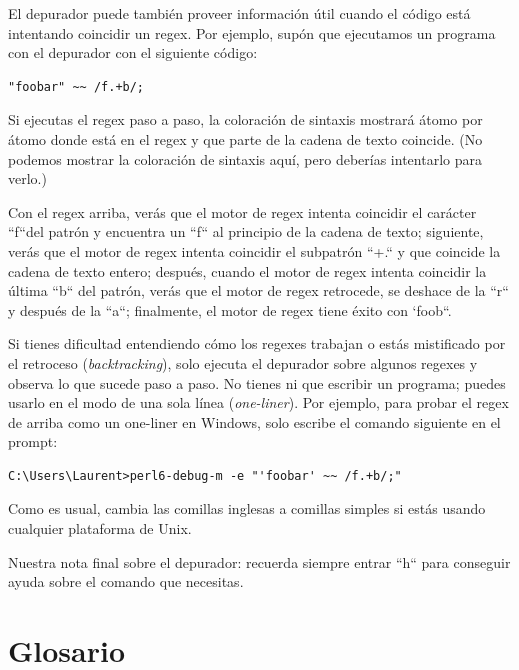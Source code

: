 El depurador puede también proveer información útil cuando
el código está intentando coincidir un regex. Por ejemplo, 
supón que ejecutamos un programa con el depurador con el
siguiente código:

\begin{lstlisting}
"foobar" ~~ /f.+b/;
\end{lstlisting}

Si ejecutas el regex paso a paso, la coloración de sintaxis mostrará
átomo por átomo donde está en el regex y que parte de la 
cadena de texto coincide. (No podemos mostrar la coloración de sintaxis
aquí, pero deberías intentarlo para verlo.)

Con el regex arriba, verás que el motor de regex 
intenta coincidir el carácter ``f``del patrón
y encuentra un ``f`` al principio de la cadena de texto;
siguiente, verás que el motor de regex intenta coincidir 
el subpatrón ``+.`` y que coincide la cadena de texto entero;
después, cuando el motor de regex intenta coincidir la 
última ``b`` del patrón, verás que el motor de regex retrocede,
se deshace de la ``r`` y después de la ``a``; finalmente,
el motor de regex tiene éxito con `foob``.

Si tienes dificultad entendiendo cómo los regexes trabajan
o estás mistificado por el retroceso (\emph{backtracking}),
solo ejecuta el depurador sobre algunos regexes y observa
lo que sucede paso a paso. No tienes ni que escribir un 
programa; puedes usarlo en el modo de una sola línea (\emph{one-liner}).
Por ejemplo, para probar el regex de arriba como un one-liner 
en Windows, solo escribe el comando siguiente en el prompt:

\begin{lstlisting}
C:\Users\Laurent>perl6-debug-m -e "'foobar' ~~ /f.+b/;"
\end{lstlisting}

Como es usual, cambia las comillas inglesas a comillas simples 
si estás usando cualquier plataforma de Unix.
 
Nuestra nota final sobre el depurador: recuerda siempre entrar
``h`` para conseguir ayuda sobre el comando que necesitas.


\section{Glosario}

